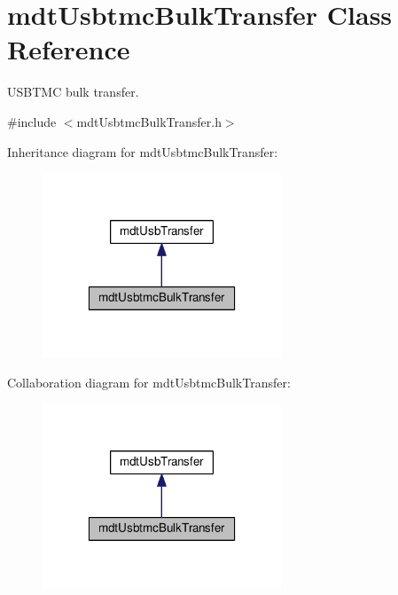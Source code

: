 \hypertarget{classmdt_usbtmc_bulk_transfer}{\section{mdt\-Usbtmc\-Bulk\-Transfer Class Reference}
\label{classmdt_usbtmc_bulk_transfer}
}


U\-S\-B\-T\-M\-C bulk transfer.  




{\ttfamily \#include $<$mdt\-Usbtmc\-Bulk\-Transfer.\-h$>$}



Inheritance diagram for mdt\-Usbtmc\-Bulk\-Transfer\-:
\nopagebreak
\begin{figure}[H]
\begin{center}
\leavevmode
\includegraphics[width=202pt]{classmdt_usbtmc_bulk_transfer__inherit__graph}
\end{center}
\end{figure}


Collaboration diagram for mdt\-Usbtmc\-Bulk\-Transfer\-:
\nopagebreak
\begin{figure}[H]
\begin{center}
\leavevmode
\includegraphics[width=202pt]{classmdt_usbtmc_bulk_transfer__coll__graph}
\end{center}
\end{figure}
